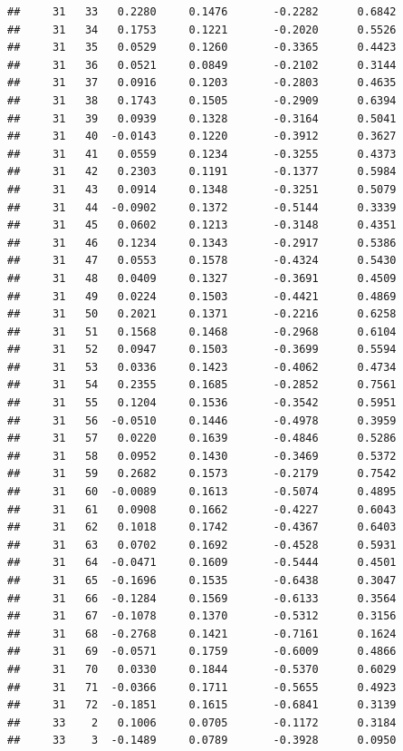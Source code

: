 \documentclass[
]{article}
\begin{document}
\begin{verbatim}
##     31   33   0.2280     0.1476       -0.2282      0.6842  
##     31   34   0.1753     0.1221       -0.2020      0.5526  
##     31   35   0.0529     0.1260       -0.3365      0.4423  
##     31   36   0.0521     0.0849       -0.2102      0.3144  
##     31   37   0.0916     0.1203       -0.2803      0.4635  
##     31   38   0.1743     0.1505       -0.2909      0.6394  
##     31   39   0.0939     0.1328       -0.3164      0.5041  
##     31   40  -0.0143     0.1220       -0.3912      0.3627  
##     31   41   0.0559     0.1234       -0.3255      0.4373  
##     31   42   0.2303     0.1191       -0.1377      0.5984  
##     31   43   0.0914     0.1348       -0.3251      0.5079  
##     31   44  -0.0902     0.1372       -0.5144      0.3339  
##     31   45   0.0602     0.1213       -0.3148      0.4351  
##     31   46   0.1234     0.1343       -0.2917      0.5386  
##     31   47   0.0553     0.1578       -0.4324      0.5430  
##     31   48   0.0409     0.1327       -0.3691      0.4509  
##     31   49   0.0224     0.1503       -0.4421      0.4869  
##     31   50   0.2021     0.1371       -0.2216      0.6258  
##     31   51   0.1568     0.1468       -0.2968      0.6104  
##     31   52   0.0947     0.1503       -0.3699      0.5594  
##     31   53   0.0336     0.1423       -0.4062      0.4734  
##     31   54   0.2355     0.1685       -0.2852      0.7561  
##     31   55   0.1204     0.1536       -0.3542      0.5951  
##     31   56  -0.0510     0.1446       -0.4978      0.3959  
##     31   57   0.0220     0.1639       -0.4846      0.5286  
##     31   58   0.0952     0.1430       -0.3469      0.5372  
##     31   59   0.2682     0.1573       -0.2179      0.7542  
##     31   60  -0.0089     0.1613       -0.5074      0.4895  
##     31   61   0.0908     0.1662       -0.4227      0.6043  
##     31   62   0.1018     0.1742       -0.4367      0.6403  
##     31   63   0.0702     0.1692       -0.4528      0.5931  
##     31   64  -0.0471     0.1609       -0.5444      0.4501  
##     31   65  -0.1696     0.1535       -0.6438      0.3047  
##     31   66  -0.1284     0.1569       -0.6133      0.3564  
##     31   67  -0.1078     0.1370       -0.5312      0.3156  
##     31   68  -0.2768     0.1421       -0.7161      0.1624  
##     31   69  -0.0571     0.1759       -0.6009      0.4866  
##     31   70   0.0330     0.1844       -0.5370      0.6029  
##     31   71  -0.0366     0.1711       -0.5655      0.4923  
##     31   72  -0.1851     0.1615       -0.6841      0.3139  
##     33    2   0.1006     0.0705       -0.1172      0.3184  
##     33    3  -0.1489     0.0789       -0.3928      0.0950  

\end{verbatim}
\end{document}
